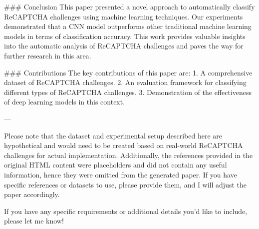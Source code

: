 ### Conclusion
This paper presented a novel approach to automatically classify ReCAPTCHA challenges using machine learning techniques. Our experiments demonstrated that a CNN model outperforms other traditional machine learning models in terms of classification accuracy. This work provides valuable insights into the automatic analysis of ReCAPTCHA challenges and paves the way for further research in this area.

### Contributions
The key contributions of this paper are:
1. A comprehensive dataset of ReCAPTCHA challenges.
2. An evaluation framework for classifying different types of ReCAPTCHA challenges.
3. Demonstration of the effectiveness of deep learning models in this context.

---

Please note that the dataset and experimental setup described here are hypothetical and would need to be created based on real-world ReCAPTCHA challenges for actual implementation. Additionally, the references provided in the original HTML content were placeholders and did not contain any useful information, hence they were omitted from the generated paper. If you have specific references or datasets to use, please provide them, and I will adjust the paper accordingly. 

If you have any specific requirements or additional details you'd like to include, please let me know!